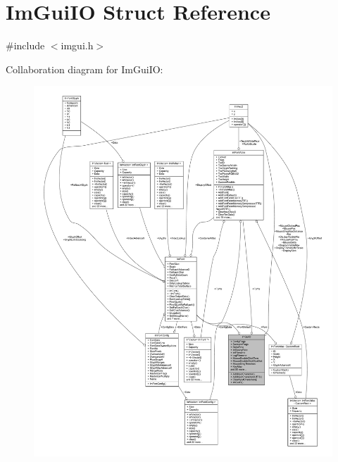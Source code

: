 \hypertarget{struct_im_gui_i_o}{}\section{Im\+Gui\+IO Struct Reference}
\label{struct_im_gui_i_o}


{\ttfamily \#include $<$imgui.\+h$>$}



Collaboration diagram for Im\+Gui\+IO\+:
\nopagebreak
\begin{figure}[H]
\begin{center}
\leavevmode
\includegraphics[width=350pt]{struct_im_gui_i_o__coll__graph}
\end{center}
\end{figure}
